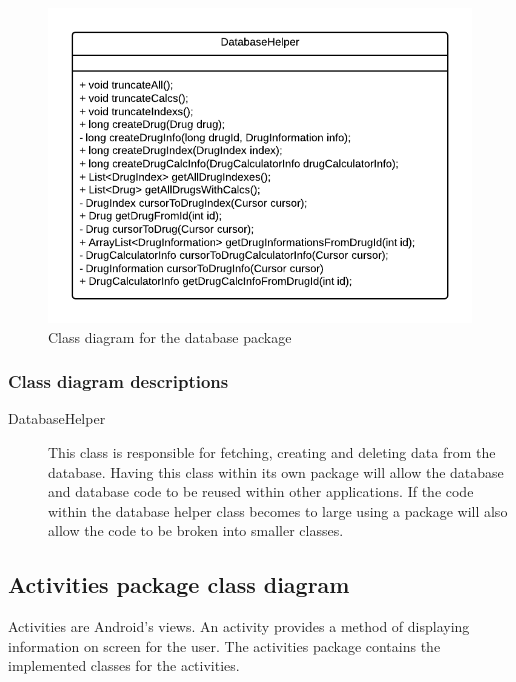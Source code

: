 \documentclass[11pt,fleqn,twoside]{article}
\begin{document}
\begin{figure}[H]
\centering
\includegraphics[width=6.5in]{database}
\caption{Class diagram for the database package}
\end{figure}

\subsubsection{Class diagram descriptions}
\begin{description}
	\item[DatabaseHelper] This class is responsible for fetching, creating and deleting data from the database. Having this class within its own package will allow the database and database code to be reused within other applications. If the code within the database helper class becomes to large using a package will also allow the code to be broken into smaller classes.
\end{description}

\subsection{Activities package class diagram}
Activities are Android's views. An activity provides a method of displaying information on screen for the user. The activities package contains the implemented classes for the activities. 
\end{document}
